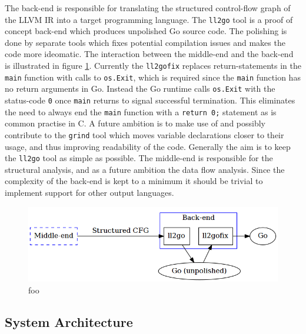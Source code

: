 \documentclass[12pt, a4paper]{article}
\begin{document}
The back-end is responsible for translating the structured control-flow graph of the LLVM IR into a target programming language. The \texttt{ll2go} tool is a proof of concept back-end which produces unpolished Go source code. The polishing is done by separate tools which fixes potential compilation issues and makes the code more ideomatic. The interaction between the middle-end and the back-end is illustrated in figure \ref{back_end}. Currently the \texttt{ll2gofix} replaces return-statements in the \texttt{main} function with calls to \texttt{os.Exit}, which is required since the \texttt{main} function has no return arguments in Go. Instead the Go runtime calls \texttt{os.Exit} with the status-code \texttt{0} once \texttt{main} returns to signal successful termination. This eliminates the need to always end the \texttt{main} function with a \texttt{return 0;} statement as is common practise in C. A future ambition is to make use of and possibly contribute to the \texttt{grind} tool which moves variable declarations closer to their usage, and thus improving readability of the code. Generally the aim is to keep the \texttt{ll2go} tool as simple as possible. The middle-end is responsible for the structural analysis, and as a future ambition the data flow analysis. Since the complexity of the back-end is kept to a minimum it should be trivial to implement support for other output languages.

\begin{figure}[htbp]
	\begin{center}
		\includegraphics[width=\textwidth]{inc/back-end.png}
		\caption{foo}
		\label{back_end}
	\end{center}
\end{figure}


\subsection{System Architecture}

\end{document}
